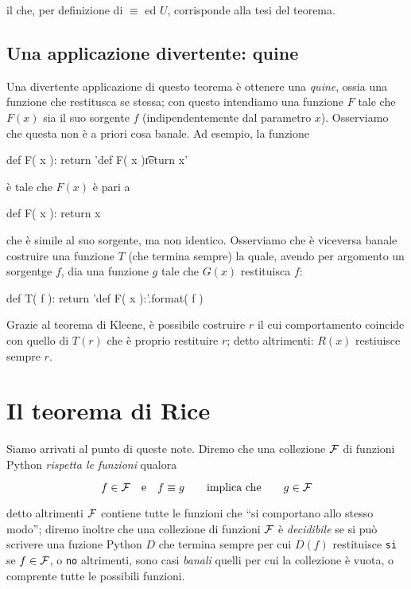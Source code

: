 \documentclass[a4paper]{article}
\begin{document}
il che, per definizione di $\equiv$ ed $U$, corrisponde alla tesi del teorema.

\subsection*{Una applicazione divertente: quine}

Una divertente applicazione di questo teorema è ottenere una \emph{quine},
ossia una funzione che restitusca se stessa; con questo intendiamo una
funzione $F$ tale che $F(x)$ sia il suo sorgente $f$ (indipendentemente dal
parametro $x$). Osserviamo che questa non è a priori cosa banale. Ad esempio,
la funzione

\begin{pycode}
def F( x ):
  return 'def F( x )\n\t return x'
\end{pycode}

è tale che $F(x)$ è pari a

\begin{pycode}
def F( x ):
  return x
\end{pycode}

che è simile al suo sorgente, ma non identico. Osserviamo che è viceversa
banale costruire una funzione $T$ (che termina sempre) la quale, avendo per
argomento un sorgentge $f$, dia una funzione $g$ tale che $G(x)$ restituisca
$f$:

\begin{pycode}
def T( f ):
  return 'def F( x ):\n{}'.format( f )
\end{pycode}

Grazie al teorema di Kleene, è possibile costruire $r$ il cui comportamento
coincide con quello di $T(r)$ che è proprio restituire $r$; detto altrimenti:
$R(x)$ restiuisce sempre $r$.

\section*{Il teorema di Rice}

Siamo arrivati al punto di queste note. Diremo che una collezione $\cal F$ di
funzioni Python \emph{rispetta le funzioni} qualora

\[
  f\in{\cal F} \quad\text{e}\quad f\equiv g \qquad\text{implica che}\qquad g\in{\cal F}
\]

detto altrimenti $\cal F$ contiene tutte le funzioni che ``si comportano allo
stesso modo''; diremo inoltre che una collezione di funzioni $\cal F$ è
\emph{decidibile} se si può scrivere una fuzione Python $D$ che termina sempre
per cui $D(f)$ restituisce \verb|si| se $f\in\cal F$, o \verb|no| altrimenti,
sono casi \emph{banali} quelli per cui la collezione è vuota, o comprente
tutte le possibili funzioni.
\end{document}
